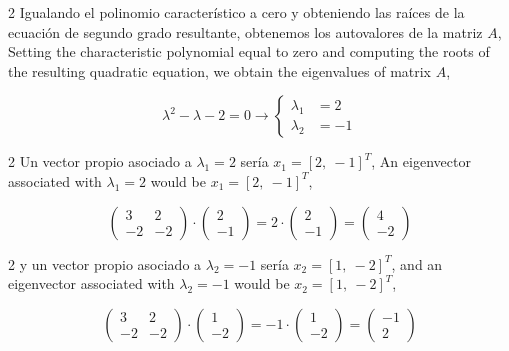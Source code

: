 \begin{paracol}{2}
Igualando el polinomio característico a cero y obteniendo las raíces de la ecuación de segundo grado resultante, obtenemos los autovalores de la matriz $A$,
\switchcolumn
Setting the characteristic polynomial equal to zero and computing the roots of the resulting quadratic equation, we obtain the eigenvalues of matrix $A$,
\end{paracol}
\begin{equation*}
\lambda^2-\lambda-2=0 \rightarrow \left\{ 
\begin{aligned}
\lambda_1&=2\\
\lambda_2&=-1
\end{aligned}
\right.
\end{equation*}
\begin{paracol}{2}
Un vector propio asociado a $\lambda_1=2$ sería $x_1=[2,\  -1]^T$,
\switchcolumn
An eigenvector associated with $\lambda_1=2$ would be $x_1=[2,\  -1]^T$,
\end{paracol}
\begin{equation*}
\begin{pmatrix}
3& 2\\
-2& -2
\end{pmatrix}\cdot \begin{pmatrix}
2\\
-1
\end{pmatrix}=2\cdot \begin{pmatrix}
2\\
-1
\end{pmatrix} =\begin{pmatrix}
4\\
-2
\end{pmatrix} 
\end{equation*}
\begin{paracol}{2}
y un vector propio asociado a $\lambda_2=-1$ sería $x_2=[1,\ -2]^T$,
\switchcolumn
and an eigenvector associated with $\lambda_2=-1$ would be $x_2=[1,\ -2]^T$,
\end{paracol}
\begin{equation*}
\begin{pmatrix}
3& 2\\
-2& -2
\end{pmatrix}\cdot \begin{pmatrix}
1\\
-2
\end{pmatrix}=-1\cdot \begin{pmatrix}
1\\
-2
\end{pmatrix} =\begin{pmatrix}
-1\\
2
\end{pmatrix} 
\end{equation*}
